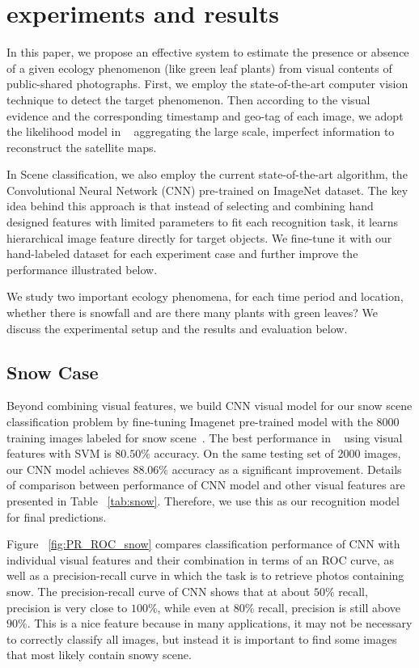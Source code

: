 \section{experiments and results}

In this paper, we propose an effective system to estimate the presence or absence 
of a given ecology phenomenon (like green leaf plants) 
from visual contents of public-shared photographs. First, we employ the state-of-the-art 
computer vision technique to detect the target phenomenon. Then according to the visual evidence 
and the corresponding timestamp and geo-tag of each image, we adopt the likelihood model in ~\cite{ecology2012www}
aggregating the large scale, imperfect information to reconstruct the satellite maps.

In Scene classification, we also employ the current state-of-the-art algorithm, 
the Convolutional Neural Network (CNN) pre-trained on ImageNet dataset. 
The key idea behind this approach is that instead of selecting and combining hand designed features 
with limited parameters to fit each recognition task, it learns hierarchical image feature directly 
for target objects.
We fine-tune it with our 
hand-labeled dataset for each experiment case and further improve the performance illustrated below.


We study two important ecology phenomena, for each time period and location, 
whether there is snowfall and are there many plants with green leaves? We discuss the experimental setup 
and the results and evaluation below.

\subsection{Snow Case}
Beyond combining visual features, 
we build CNN visual model for our snow scene classification problem 
by fine-tuning Imagenet pre-trained model with the 8000 training images labeled for snow scene~\cite{wang2013observing}. The best 
performance in ~\cite{wang2013observing} using visual features with SVM is $80.50\%$ accuracy.
On the same testing set of 2000 images, our CNN model achieves $88.06\%$ accuracy as a significant 
improvement. Details of comparison between performance of CNN model
 and other visual features are presented in Table ~\ref{tab:snow}. Therefore, we use this as our recognition model for final predictions.

Figure ~\ref{fig:PR_ROC_snow} compares classification performance of CNN with 
individual visual features and their combination in terms of an ROC curve, 
as well as a precision-recall curve in which the task is to retrieve photos containing snow.
The precision-recall curve of CNN shows that at about $50\%$ recall, precision is very close to $100\%$, 
while even at $80\%$ recall, precision is still above $90\%$. This is a nice feature because 
in many applications, it may not be necessary to correctly 
classify all images, but instead it is important to find some images that most likely contain snowy 
scene.

